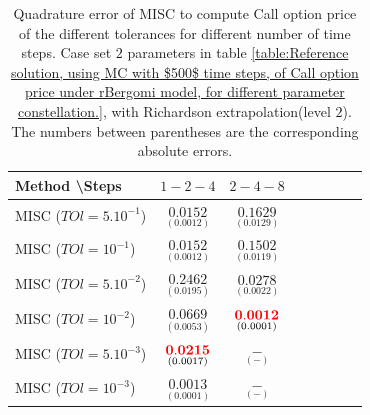 \documentclass[11pt]{article}
\begin{document}
		

\begin{table}[!h]
	\centering
	\begin{tabular}{l*{6}{c}r}
		Method \textbackslash  Steps            & $1-2-4$ & $2-4-8$  \\
		\hline
		MISC ($TOl=5.10^{-1}$)  & $\underset{(  0.0012)}{\mathbf{  0.0152}}$ & $\underset{(0.0129)}{\mathbf{ 0.1629}}$ \\
		MISC ($TOl=10^{-1}$)  & $\underset{(  0.0012)}{\mathbf{  0.0152}}$& $\underset{( 0.0119)}{\mathbf{0.1502}}$  \\
		MISC ($TOl=5.10^{-2}$)  & $\underset{(  0.0195)}{\mathbf{   0.2462}}$ & $\underset{(0.0022)}{\mathbf{ 0.0278}}$   \\
		MISC ($TOl=10^{-2}$)  & $\underset{(0.0053)}{\mathbf{0.0669}}$ &    $\underset{(0.0001)}{\mathbf{{\color{red}0.0012}}}$   \\
		
		MISC ($TOl=5.10^{-3}$)  & $\underset{(0.0017)}{\mathbf{
			{\color{red}0.0215}}}$ &    $\underset{(-
			)}{\mathbf{-}}$ \\
		MISC ($TOl=10^{-3}$)  & $\underset{(0.0001
			)}{\mathbf{0.0013}}$ &    $\underset{(-
			)}{\mathbf{ -}}$ \\
		
		
		\hline
	\end{tabular}
	\caption{Quadrature error of MISC to compute Call option price of the different tolerances for different number of time steps. Case set $2$ parameters in table \ref{table:Reference solution, using MC with $500$ time steps, of Call option price under rBergomi model, for different parameter constellation.}, with Richardson extrapolation(level $2$). The numbers between parentheses are the corresponding absolute errors.}
	\label{Quadrature error of MISC to compute Call option price of the different tolerances for different number of time steps. Case set $2$ parameters, with Richardson extrapolation(level $2$). The numbers between parentheses are the corresponding absolute errors}
\end{table}
\end{document}
